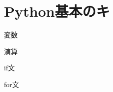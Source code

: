 \documentclass[dvipdfmx]{beamer}
\begin{document}
\section{Python基本のキ}
    \begin{frame}{変数}
        
    \end{frame}
    \begin{frame}{演算}
        
    \end{frame}
    \begin{frame}{if文}

    \end{frame}
    \begin{frame}{for文}
        
    \end{frame}
\end{document}
